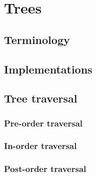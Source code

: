 \chapter{Trees}
\label{chap:trees}

\section{Terminology}

\section{Implementations}

\section{Tree traversal}
\subsection{Pre-order traversal}
\subsection{In-order traversal}
\subsection{Post-order traversal}
